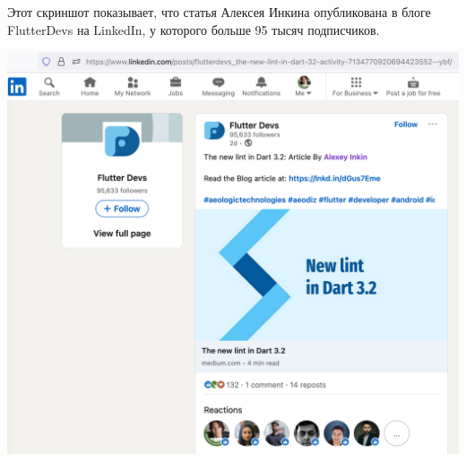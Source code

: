 
Этот скриншот показывает, что статья Алексея Инкина опубликована
в блоге FlutterDevs на LinkedIn,
у которого больше 95 тысяч подписчиков.

\begin{center}
    \includegraphics[width=\textwidth]{flutter-devs-post}
\end{center}

\pagebreak
